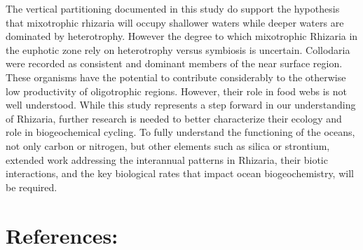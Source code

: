 \documentclass[
]{article}
\begin{document}
The vertical partitioning documented in this study do support the
hypothesis that mixotrophic rhizaria will occupy shallower waters while
deeper waters are dominated by heterotrophy. However the degree to which
mixotrophic Rhizaria in the euphotic zone rely on heterotrophy versus
symbiosis is uncertain. Collodaria were recorded as consistent and
dominant members of the near surface region. These organisms have the
potential to contribute considerably to the otherwise low productivity
of oligotrophic regions. However, their role in food webs is not well
understood. While this study represents a step forward in our
understanding of Rhizaria, further research is needed to better
characterize their ecology and role in biogeochemical cycling. To fully
understand the functioning of the oceans, not only carbon or nitrogen,
but other elements such as silica or strontium, extended work addressing
the interannual patterns in Rhizaria, their biotic interactions, and the
key biological rates that impact ocean biogeochemistry, will be
required.

\hypertarget{references}{%
\section{References:}\label{references}}
\end{document}
